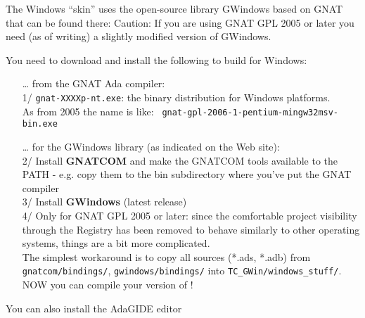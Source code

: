 \documentclass[11pt,a4paper]{article}
\begin{document}
The Windows ``skin'' uses the open-source library GWindows based on GNAT
that can be found there:
Caution: If you are using GNAT GPL 2005 or later you need (as of writing) a
slightly modified version of GWindows.

You need to download and install the following to build {\TC} for Windows:

\begin{itemize}

\item[\ldots] from the GNAT Ada compiler:\\
  1/ {\tt gnat-XXXXp-nt.exe}: the binary distribution for Windows platforms.\\
  As from 2005 the name is like: {\tt
  gnat-gpl-2006-1-pentium-mingw32msv-bin.exe}\\

\item[\ldots] for the GWindows library (as indicated on the Web site):\\
  2/ Install {\bf GNATCOM} and make the GNATCOM tools available to the PATH - e.g. copy them
     to the \bs bin subdirectory where you've put the GNAT compiler\\
%
  3/ Install {\bf GWindows} (latest release)\\
%
  4/ Only for GNAT GPL 2005 or later: since the comfortable
     project visibility through the Registry has been removed to
     behave similarly to other operating systems, things are a bit more
     complicated.\\
     The simplest workaround is to copy
     all sources (*.ads, *.adb) from {\tt gnatcom/bindings/},
     {\tt gwindows/bindings/} into
     {\tt TC\_GWin/windows\_stuff/}. NOW you can compile your
     version of {\TC} !

\end{itemize}

You can also install the AdaGIDE editor
\end{document}
